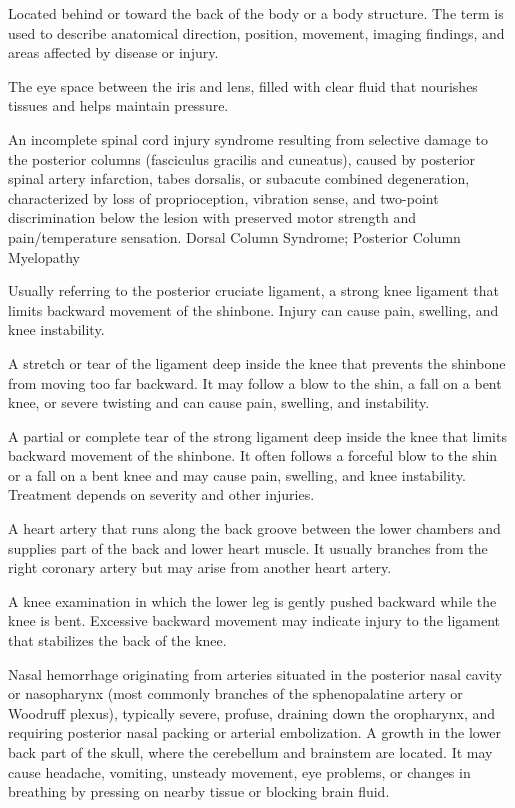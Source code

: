  Located behind or toward the back of the body or a body structure. The term is used to describe anatomical direction, position, movement, imaging findings, and areas affected by disease or injury.

 The eye space between the iris and lens, filled with clear fluid that nourishes tissues and helps maintain pressure.

 An incomplete spinal cord injury syndrome resulting from selective damage to the posterior columns (fasciculus gracilis and cuneatus), caused by posterior spinal artery infarction, tabes dorsalis, or subacute combined degeneration, characterized by loss of proprioception, vibration sense, and two-point discrimination below the lesion with preserved motor strength and pain/temperature sensation.
\synonyms
Dorsal Column Syndrome; Posterior Column Myelopathy

 Usually referring to the posterior cruciate ligament, a strong knee ligament that limits backward movement of the shinbone. Injury can cause pain, swelling, and knee instability.

 A stretch or tear of the ligament deep inside the knee that prevents the shinbone from moving too far backward. It may follow a blow to the shin, a fall on a bent knee, or severe twisting and can cause pain, swelling, and instability.

 A partial or complete tear of the strong ligament deep inside the knee that limits backward movement of the shinbone. It often follows a forceful blow to the shin or a fall on a bent knee and may cause pain, swelling, and knee instability. Treatment depends on severity and other injuries.

 A heart artery that runs along the back groove between the lower chambers and supplies part of the back and lower heart muscle. It usually branches from the right coronary artery but may arise from another heart artery.

 A knee examination in which the lower leg is gently pushed backward while the knee is bent. Excessive backward movement may indicate injury to the ligament that stabilizes the back of the knee.

 Nasal hemorrhage originating from arteries situated in the posterior nasal cavity or nasopharynx (most commonly branches of the sphenopalatine artery or Woodruff plexus), typically severe, profuse, draining down the oropharynx, and requiring posterior nasal packing or arterial embolization.
 A growth in the lower back part of the skull, where the cerebellum and brainstem are located. It may cause headache, vomiting, unsteady movement, eye problems, or changes in breathing by pressing on nearby tissue or blocking brain fluid.

